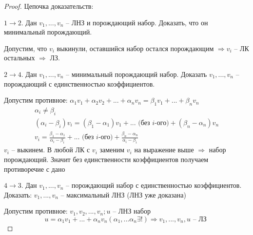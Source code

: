\begin{proof}
    Цепочка доказательств:

    \begin{center}
    \end{center}

    $1 \to 2$. Дан $v_1, ..., v_n$ -- ЛНЗ и порождающий набор.
    Доказать, что он минимальный порождающий.

    Допустим, что $v_i$ выкинули, оставшийся набор остался порождающим
    $\Rightarrow v_i$ -- ЛК остальных $\Rightarrow$ ЛЗ.

    $2 \to 4$. Дан $v_1, ..., v_n$ -- минимальный порождающий набор.
    Доказать $v_1, ..., v_n$ -- порождающий с единственностью коэффициентов.

    Допустим противное: $\alpha_1 v_1 + \alpha_2 v_2 + ... + \alpha_n v_n =
        \beta_1 v_1 + ... + \beta_n v_n$
    \begin{gather*}
        \alpha_i \neq \beta_i\\
        (\alpha_i - \beta_i)v_i = (\beta_1 - \alpha_1) v_1 + ...\text{ (без $i$-ого)}
        + (\beta_n - \alpha_n)v_n\\
        v_i = \frac{\beta_1 - \alpha_1}{\alpha_i - \beta_i} + ...\text{ (без $i$-ого)}
        + \frac{\beta_n - \alpha_n}{\alpha_i - \beta_i}
    \end{gather*}
    $v_i$ -- выкинем. В любой ЛК с $v_i$ заменим $v_i$ на выражение выше $\Rightarrow$
    набор порождающий. Значит без единственности коэффициентов получаем противоречие с дано

    $4 \to 3$. Дан $v_1, ..., v_n$ -- порождающий набор с единственностью коэффициентов.
    Доказать: $v_1, ..., v_n$ -- максимальный ЛНЗ (ЛНЗ уже доказана)

    Допустим противное: $v_1, v_2, ..., v_n; u$ --  ЛНЗ набор
    \[u = \alpha_1 v_1 + ... + \alpha_n v_n (\alpha_1, ... \alpha_n \exists!)
        \Rightarrow v_1, ..., v_n, u \text{ -- ЛЗ }\]


\end{proof}
